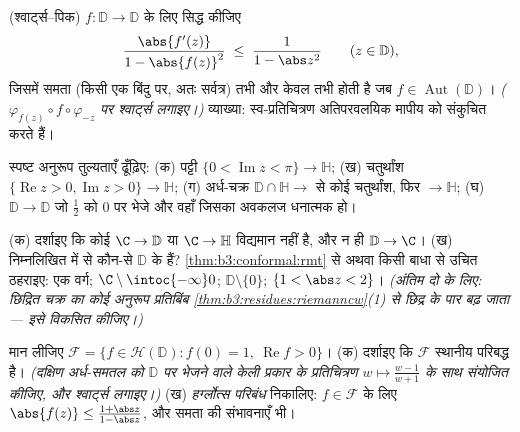 \begin{exercise}[$\star\star$]\label{exo:b3:conformal:3}
(श्वार्ट्स--पिक)  $f\colon \mathbb D \to
\mathbb D$ के लिए सिद्ध कीजिए
\[
\frac{\abs{f'(z)}}{1 - \abs{f(z)}^2} \;\leq\;
\frac{1}{1 - \abs z^2}
\qquad (z \in \mathbb D),
\]
जिसमें समता (किसी एक बिंदु पर, अतः सर्वत्र) तभी और केवल तभी होती
है जब $f \in
\operatorname{Aut}(\mathbb D)$। \emph{($\varphi_{f(z)}\circ
f\circ\varphi_{-z}$ पर श्वार्ट्स लगाइए।)} व्याख्या:
 स्व-प्रतिचित्रण अतिपरवलयिक मापीय को संकुचित करते हैं।
\end{exercise}

\begin{exercise}[$\star\star$]\label{exo:b3:conformal:4}
स्पष्ट अनुरूप तुल्यताएँ ढूँढ़िए:
(क) पट्टी $\{0 < \operatorname{Im}z < \pi\} \to \mathbb H$;
(ख) चतुर्थांश $\{\operatorname{Re}z > 0,
\operatorname{Im}z > 0\} \to \mathbb H$;
(ग) अर्ध-चक्र $\mathbb D\cap\mathbb H \to$ से कोई चतुर्थांश, फिर $\to \mathbb H$;
(घ) $\mathbb D \to \mathbb D$ जो $\frac12$ को $0$ पर भेजे और वहाँ जिसका अवकलज धनात्मक
हो।
\end{exercise}

\begin{exercise}[$\star\star$]\label{exo:b3:conformal:5}
(क) दर्शाइए कि कोई  $\C \to \mathbb D$ या $\C \to
\mathbb H$ विद्यमान
नहीं है, और न ही $\mathbb D \to \C$।
(ख) निम्नलिखित में से कौन-से $\mathbb D$ के  हैं? \cref{thm:b3:conformal:rmt} से
अथवा किसी बाधा से उचित ठहराइए: एक वर्ग; $\C\setminus\intoc{-\infty}0$; $\mathbb D\setminus\{0\}$; $\{1 < \abs z < 2\}$।
\emph{(अंतिम दो के लिए: छिद्रित चक्र का कोई अनुरूप प्रतिबिंब
\cref{thm:b3:residues:riemanncw}(1) से छिद्र के पार बढ़ जाता --- इसे विकसित कीजिए।)}
\end{exercise}

\begin{exercise}[$\star\star$]\label{exo:b3:conformal:6}
मान लीजिए $\mathcal F = \{f \in \mathcal H(\mathbb D) : f(0) = 1,\
\operatorname{Re}f > 0\}$।
(क) दर्शाइए कि $\mathcal F$ स्थानीय परिबद्ध है। \emph{(दक्षिण अर्ध-समतल
को $\mathbb D$ पर भेजने वाले केली प्रकार के प्रतिचित्रण $w \mapsto \frac{w -
1}{w + 1}$ के साथ
संयोजित कीजिए, और श्वार्ट्स लगाइए।)}
(ख) \emph{हर्ग्लोत्स परिबंध} निकालिए: $f \in \mathcal F$ के लिए $\abs{f(z)} \leq
\frac{1 + \abs z}{1 - \abs z}$, और
समता की संभावनाएँ भी।
\end{exercise}

